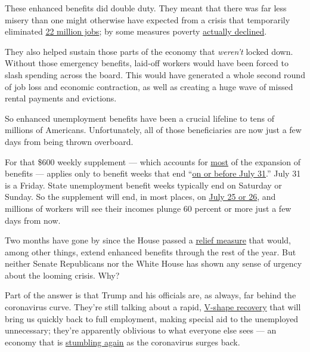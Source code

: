 These enhanced benefits did double duty. They meant that there was far
less misery than one might otherwise have expected from a crisis that
temporarily eliminated
\href{https://fred.stlouisfed.org/series/PAYEMS}{22 million jobs}; by
some measures poverty
\href{https://harris.uchicago.edu/news-events/news/new-poverty-measure-confirms-coronavirus-driven-federal-stimulus-measures-were}{actually
declined}.

They also helped sustain those parts of the economy that \emph{weren't}
locked down. Without those emergency benefits, laid-off workers would
have been forced to slash spending across the board. This would have
generated a whole second round of job loss and economic contraction, as
well as creating a huge wave of missed rental payments and evictions.

So enhanced unemployment benefits have been a crucial lifeline to tens
of millions of Americans. Unfortunately, all of those beneficiaries are
now just a few days from being thrown overboard.

For that \$600 weekly supplement --- which accounts for
\href{https://www.bea.gov/system/files/2020-06/Effects-of-Selected-Federal-Pandemic-Response-Programs-on-Personal-Income-May-2020.pdf}{most}
of the expansion of benefits --- applies only to benefit weeks that end
``\href{https://www.natlawreview.com/article/additional-600-unemployment-payment-expiration-date-looms-near}{on
or before July 31}.'' July 31 is a Friday. State unemployment benefit
weeks typically end on Saturday or Sunday. So the supplement will end,
in most places, on
\href{https://www.cnbc.com/2020/06/26/the-extra-600-unemployment-benefits-will-end-before-july-31.html}{July
25 or 26}, and millions of workers will see their incomes plunge 60
percent or more just a few days from now.

Two months have gone by since the House passed a
\href{https://www.congress.gov/bill/116th-congress/house-bill/6800}{relief
measure} that would, among other things, extend enhanced benefits
through the rest of the year. But neither Senate Republicans nor the
White House has shown any sense of urgency about the looming crisis.
Why?

Part of the answer is that Trump and his officials are, as always, far
behind the coronavirus curve. They're still talking about a rapid,
\href{https://twitter.com/JStein_WaPo/status/1282349502284865536}{V-shape
recovery} that will bring us quickly back to full employment, making
special aid to the unemployed unnecessary; they're apparently oblivious
to what everyone else sees --- an economy that is
\href{https://www.nytimes3xbfgragh.onion/2020/07/15/business/economy/economic-recovery-coronavirus-resurgence.html}{stumbling
again} as the coronavirus surges back.

